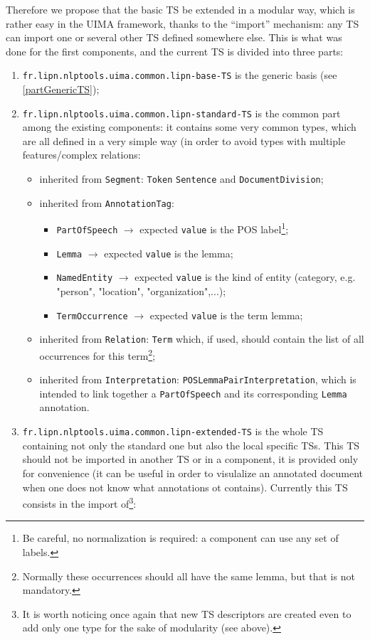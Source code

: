 \documentclass{article}
\newenvironment{xenumerate}{
\begin{enumerate}
  \setlength{\itemsep}{.3\baselineskip}
  \setlength{\topsep}{0pt}
  \setlength{\parskip}{0pt}
  \setlength{\parsep}{0pt}
}{\end{enumerate}}
\newenvironment{xitemize}{
\begin{itemize}
  \setlength{\itemsep}{.3\baselineskip}
  \setlength{\topsep}{0pt}
  \setlength{\parskip}{0pt}
  \setlength{\parsep}{0pt}
}{\end{itemize}}
\begin{document}
Therefore we propose that the basic TS be extended in a modular way, which is rather easy in the UIMA framework, thanks to the ``import'' mechanism: any TS can import one or several other TS defined somewhere else. This is what was done for the first components, and the current TS is divided into three parts:
\begin{xenumerate}
\item {\tt fr.lipn.nlptools.uima.common.lipn-base-TS} is the generic basis (see \ref{partGenericTS});
\item {\tt fr.lipn.nlptools.uima.common.lipn-standard-TS} is the common part among the existing components: it contains some very common types, which are all defined in a very simple way (in order to avoid types with multiple features/complex relations: 
\begin{xitemize}
\item inherited from {\tt Segment}: {\tt Token} {\tt Sentence} and {\tt DocumentDivision};
\item inherited from {\tt AnnotationTag}: 
\begin{xitemize}
\item {\tt PartOfSpeech} $\rightarrow$ expected {\tt value} is the POS label\footnote{Be careful, no normalization is required: a component can use any set of labels.};
\item {\tt Lemma} $\rightarrow$ expected {\tt value} is the lemma;
\item {\tt NamedEntity} $\rightarrow$ expected {\tt value} is the kind of entity (category, e.g. "person", "location", "organization",...);
\item {\tt TermOccurrence} $\rightarrow$ expected {\tt value} is the term lemma;
\end{xitemize}
\item inherited from {\tt Relation}: {\tt Term} which, if used, should contain the list of all occurrences for this term\footnote{Normally these occurrences should all have the same lemma, but that is not mandatory.};
\item inherited from {\tt Interpretation}: {\tt POSLemmaPairInterpretation}, which is intended to link together a {\tt PartOfSpeech} and its corresponding {\tt Lemma} annotation.
\end{xitemize}
\item {\tt fr.lipn.nlptools.uima.common.lipn-extended-TS} is the whole TS containing not only the standard one but also the local specific TSs. This TS should not be imported in another TS or in a component, it is provided only for convenience (it can be useful in order to visulalize an annotated document when one does not know what annotations ot contains). Currently this TS consists in the import of\footnote{It is worth noticing once again that new TS descriptors are created even to add only one type for the sake of modularity (see above).}:

\end{xenumerate}
\end{document}
